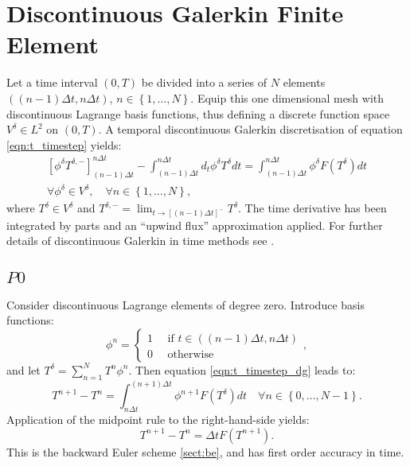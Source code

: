 \documentclass[a4paper]{book}
\begin{document}
\section{Discontinuous Galerkin Finite Element}

Let a time interval $(0, T)$ be divided into a series of $N$ elements
$( (n - 1) \Delta t, n \Delta t )$,
$n \in \left\{ 1, \ldots, N \right\}$. Equip this one dimensional mesh with
discontinuous Lagrange basis functions, thus defining a discrete function
space $V^\delta \in L^2$ on $(0, T)$. A temporal discontinuous Galerkin
discretisation of equation \eqref{eqn:t_timestep} yields:
\begin{align}\label{eqn:t_timestep_dg}
  \left[ \phi^\delta T^{\delta,-} \right]_{(n - 1) \Delta t}^{n \Delta t}
    - \int_{(n - 1) \Delta t}^{n \Delta t} d_t \phi^\delta T^\delta dt
    = \int_{(n - 1) \Delta t}^{n \Delta t} \phi^\delta F \left( T^\delta \right) dt \nonumber \\
    \forall \phi^\delta \in V^\delta, \quad \forall n \in \left\{ 1, \ldots, N \right\},
\end{align}
where $T^\delta \in V^\delta$ and
$T^{\delta,-} = \lim_{t \rightarrow \left[ (n - 1) \Delta t \right]^{-}} T^{\delta}$.
The time derivative has been integrated by parts and an ``upwind flux''
approximation applied. For further details of discontinuous Galerkin in time
methods see \citet{gresho2000}.

\subsection{$P0$}

Consider discontinuous Lagrange elements of degree zero. Introduce basis
functions:
\begin{equation}
  \phi^n = \left\{ \begin{array}{l} 1 \quad \textrm{ if } t \in \left( (n - 1) \Delta t, n \Delta t \right) \\
                                    0 \quad \textrm{ otherwise}\end{array} \right. ,
\end{equation}
and let $T^\delta = \sum_{n = 1}^N T^n \phi^n$. Then equation
\eqref{eqn:t_timestep_dg} leads to:
\begin{equation}
  T^{n + 1} - T^n
    = \int_{n \Delta t}^{(n + 1) \Delta t} \phi^{n + 1} F \left( T^\delta \right) dt \quad \forall n \in \left\{ 0, \ldots, N - 1 \right\}.
\end{equation}
Application of the midpoint rule to the right-hand-side yields:
\begin{equation}
  T^{n + 1} - T^n = \Delta t F \left( T^{n + 1} \right).
\end{equation}
This is the backward Euler scheme \ref{sect:be}, and has first order accuracy
in time.
\end{document}
